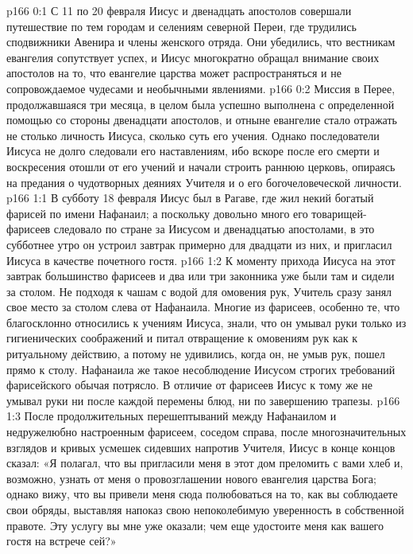 \author{Комиссия срединников}
\vs p166 0:1 С 11 по 20 февраля Иисус и двенадцать апостолов совершали путешествие по тем городам и селениям северной Переи, где трудились сподвижники Авенира и члены женского отряда. Они убедились, что вестникам евангелия сопутствует успех, и Иисус многократно обращал внимание своих апостолов на то, что евангелие царства может распространяться и не сопровождаемое чудесами и необычными явлениями.
\vs p166 0:2 Миссия в Перее, продолжавшаяся три месяца, в целом была успешно выполнена с определенной помощью со стороны двенадцати апостолов, и отныне евангелие стало отражать не столько личность Иисуса, сколько суть его учения. Однако последователи Иисуса не долго следовали его наставлениям, ибо вскоре после его смерти и воскресения отошли от его учений и начали строить раннюю церковь, опираясь на предания о чудотворных деяниях Учителя и о его богочеловеческой личности.
\vs p166 1:1 В субботу 18 февраля Иисус был в Рагаве, где жил некий богатый фарисей по имени Нафанаил; а поскольку довольно много его товарищей\hyp{}фарисеев следовало по стране за Иисусом и двенадцатью апостолами, в это субботнее утро он устроил завтрак примерно для двадцати из них, и пригласил Иисуса в качестве почетного гостя.
\vs p166 1:2 К моменту прихода Иисуса на этот завтрак большинство фарисеев и два или три законника уже были там и сидели за столом. Не подходя к чашам с водой для омовения рук, Учитель сразу занял свое место за столом слева от Нафанаила. Многие из фарисеев, особенно те, что благосклонно относились к учениям Иисуса, знали, что он умывал руки только из гигиенических соображений и питал отвращение к омовениям рук как к ритуальному действию, а потому не удивились, когда он, не умыв рук, пошел прямо к столу. Нафанаила же такое несоблюдение Иисусом строгих требований фарисейского обычая потрясло. В отличие от фарисеев Иисус к тому же не умывал руки ни после каждой перемены блюд, ни по завершению трапезы.
\vs p166 1:3 После продолжительных перешептываний между Нафанаилом и недружелюбно настроенным фарисеем, соседом справа, после многозначительных взглядов и кривых усмешек сидевших напротив Учителя, Иисус в конце концов сказал: «Я полагал, что вы пригласили меня в этот дом преломить с вами хлеб и, возможно, узнать от меня о провозглашении нового евангелия царства Бога; однако вижу, что вы привели меня сюда полюбоваться на то, как вы соблюдаете свои обряды, выставляя напоказ свою непоколебимую уверенность в собственной правоте. Эту услугу вы мне уже оказали; чем еще удостоите меня как вашего гостя на встрече сей?»
